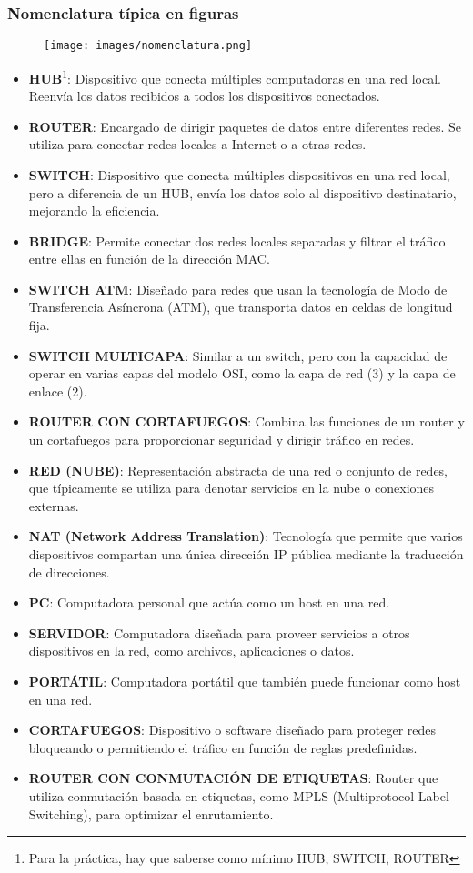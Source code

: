 \documentclass[a4paper,12pt]{article}
\begin{document}
\subsubsection{Nomenclatura típica en figuras}
    \begin{figure}[H]
        \centering
        \texttt{[image: images/nomenclatura.png]}
    \end{figure}

\begin{itemize}
    \item \textbf{HUB}\footnote{Para la práctica, hay que saberse como mínimo HUB, SWITCH, ROUTER}: Dispositivo que conecta múltiples computadoras en una red local. Reenvía los datos recibidos a todos los dispositivos conectados.
    \item \textbf{ROUTER}: Encargado de dirigir paquetes de datos entre diferentes redes. Se utiliza para conectar redes locales a Internet o a otras redes.
    \item \textbf{SWITCH}: Dispositivo que conecta múltiples dispositivos en una red local, pero a diferencia de un HUB, envía los datos solo al dispositivo destinatario, mejorando la eficiencia.
    \item \textbf{BRIDGE}: Permite conectar dos redes locales separadas y filtrar el tráfico entre ellas en función de la dirección MAC.
    \item \textbf{SWITCH ATM}: Diseñado para redes que usan la tecnología de Modo de Transferencia Asíncrona (ATM), que transporta datos en celdas de longitud fija.
    \item \textbf{SWITCH MULTICAPA}: Similar a un switch, pero con la capacidad de operar en varias capas del modelo OSI, como la capa de red (3) y la capa de enlace (2).
    \item \textbf{ROUTER CON CORTAFUEGOS}: Combina las funciones de un router y un cortafuegos para proporcionar seguridad y dirigir tráfico en redes.
    \item \textbf{RED (NUBE)}: Representación abstracta de una red o conjunto de redes, que típicamente se utiliza para denotar servicios en la nube o conexiones externas.
    \item \textbf{NAT (Network Address Translation)}: Tecnología que permite que varios dispositivos compartan una única dirección IP pública mediante la traducción de direcciones.
    \item \textbf{PC}: Computadora personal que actúa como un host en una red.
    \item \textbf{SERVIDOR}: Computadora diseñada para proveer servicios a otros dispositivos en la red, como archivos, aplicaciones o datos.
    \item \textbf{PORTÁTIL}: Computadora portátil que también puede funcionar como host en una red.
    \item \textbf{CORTAFUEGOS}: Dispositivo o software diseñado para proteger redes bloqueando o permitiendo el tráfico en función de reglas predefinidas.
    \item \textbf{ROUTER CON CONMUTACIÓN DE ETIQUETAS}: Router que utiliza conmutación basada en etiquetas, como MPLS (Multiprotocol Label Switching), para optimizar el enrutamiento.
\end{itemize}
\end{document}
